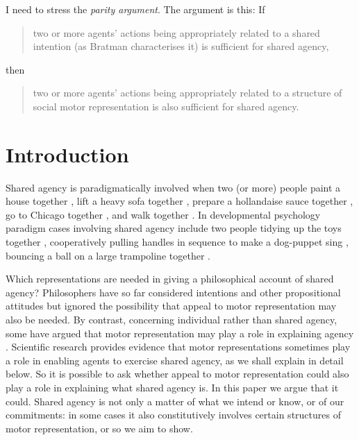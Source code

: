\documentclass[12pt,\papersize]{extarticle}
\begin{document}
I need to stress the \emph{parity argument}.
The argument is this:
If 
\begin{quote}

	two or more agents' actions being appropriately related to a shared intention (as Bratman characterises it) is sufficient for shared agency, 
\end{quote}
then
\begin{quote}
	two or more agents' actions being appropriately related to a structure of social motor representation is also sufficient for shared agency.
\end{quote}




\section{Introduction}
Shared agency is paradigmatically involved when two (or more) people 
	paint a house together \citep{Bratman:1992mi}, 
	lift a heavy sofa together \citep{Velleman:1997oo}, 
	prepare a hollandaise sauce together \citep{Searle:1990em}, 
	go to Chicago together \citep{Kutz:2000si}, 
	and walk together \citep{gilbert_walking_1990}.
In developmental psychology paradigm cases involving shared agency include  two people 
	tidying up the toys together \citep{Behne:2005qh},
	cooperatively pulling handles in sequence to make a dog-puppet sing \citep{Brownell:2006gu},
	bouncing a ball on a large trampoline together \citep{Tomasello:2007gl}.

Which representations %
are needed in giving a philosophical account of shared agency?
Philosophers have so far considered intentions and other propositional attitudes but ignored the possibility that appeal to motor representation may also be needed. 
By contrast, concerning individual rather than shared agency, some have argued that motor representation may play a role in explaining agency \citep[e.g.][]{pacherie:2000_content,pacherie:2008_action,butterfill:2012_intention}. 
Scientific research provides evidence that motor representations sometimes play a role in enabling agents to exercise shared agency, as we shall explain in detail below.
So it is possible to ask whether appeal to motor representation  %
could also play a role in explaining what shared agency is.
In this paper we argue that it could.
Shared agency is not only a matter of what we intend or know, or of our commitments: in some cases it also constitutively involves certain structures of motor representation, or so we aim to show.
\end{document}
